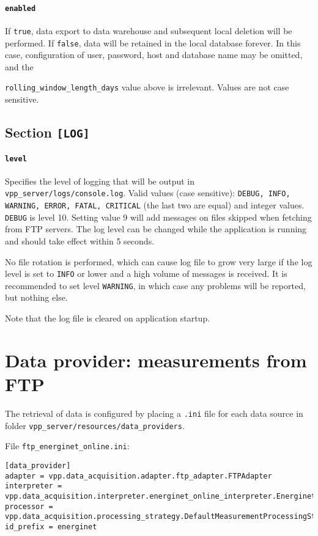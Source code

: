 \paragraph{\texttt{enabled}} If \texttt{true}, data export to data warehouse and subsequent local deletion will be performed. If \texttt{false}, data will be retained in the local database forever. In this case, configuration of user, password, host and database name may be omitted, and the {\texttt{rolling\_window\_length\_days} value above is irrelevant. Values are not case sensitive.
	
\subsection{Section \texttt{[LOG]}}
\paragraph{\texttt{level}} Specifies the level of logging that will be output in \\ \texttt{vpp\_server/logs/console.log}. Valid values (case sensitive): \texttt{DEBUG, INFO, WARNING, ERROR, FATAL, CRITICAL} (the last two are equal) and integer values. \texttt{DEBUG} is level 10. Setting value 9 will add messages on files skipped when fetching from FTP servers. The log level can be changed while the application is running and should take effect within 5 seconds.

No file rotation is performed, which can cause log file to grow very large if the log level is set to \texttt{INFO} or lower and a high volume of messages is received. It is recommended to set level \texttt{WARNING}, in which case any problems will be reported, but nothing else.

Note that the log file is cleared on application startup.

\section{Data provider: measurements from FTP}

The retrieval of data is configured by placing a \texttt{.ini} file for each data source in folder \texttt{vpp\_server/resources/data\_providers}. 


File \texttt{ftp\_energinet\_online.ini}:
\begin{lstlisting}
[data_provider]
adapter = vpp.data_acquisition.adapter.ftp_adapter.FTPAdapter
interpreter = vpp.data_acquisition.interpreter.energinet_online_interpreter.EnerginetOnlineInterpreter
processor = vpp.data_acquisition.processing_strategy.DefaultMeasurementProcessingStrategy
id_prefix = energinet


\end{lstlisting}}
